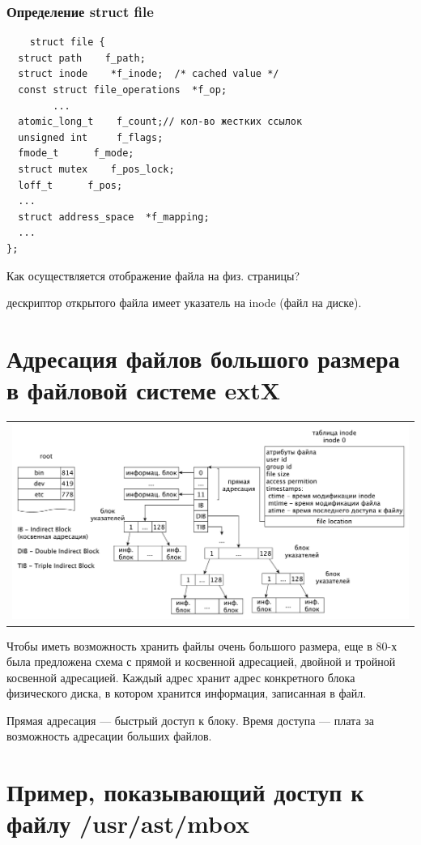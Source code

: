 \subsubsection{Определение struct file}
\begin{lstlisting}
    struct file {
  struct path    f_path;
  struct inode    *f_inode;  /* cached value */
  const struct file_operations  *f_op;
        ...
  atomic_long_t    f_count;// кол-во жестких ссылок
  unsigned int     f_flags;
  fmode_t      f_mode;
  struct mutex    f_pos_lock;
  loff_t      f_pos;
  ...
  struct address_space  *f_mapping;
  ...
};
\end{lstlisting}
Как осуществляется отображение файла на физ. страницы?

дескриптор открытого файла имеет указатель на inode (файл на диске).

\section{Адресация файлов большого размера в файловой системе extX}

\begin{table}[h!]
  \centering
  \begin{tabular}{p{1\linewidth}}
    \centering
    \includegraphics[width=0.8\linewidth]{./images/extX.pdf}
  \end{tabular}
\end{table}

Чтобы иметь возможность хранить файлы очень большого размера, еще в 80-х была предложена схема с прямой и косвенной адресацией, двойной и тройной косвенной адресацией. Каждый адрес хранит адрес конкретного блока физического диска, в котором хранится информация, записанная в файл.

Прямая адресация --- быстрый доступ к блоку. Время доступа --- плата за возможность адресации больших файлов.

\section{Пример, показывающий доступ к файлу /usr/ast/mbox}

